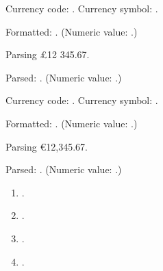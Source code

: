 \documentclass[12pt]{article}
\begin{document}
\DTLGBLocaleHook
Currency code: \DTLCurrencyCode.
Currency symbol: \DTLCurrencySymbol. 

Formatted: \GBformattedresult.
(Numeric value: \DTLdatumvalue{\GBformattedresult}.) 

Parsing £12 345.67.
\DTLparse{}


Parsed: \GBparsed.
(Numeric value: \DTLdatumvalue{\GBparsed}.) 

\DTLIELocaleHook
Currency code: \DTLCurrencyCode.
Currency symbol: \DTLCurrencySymbol. 

Formatted: \IEformattedresult.
(Numeric value: \DTLdatumvalue{\IEformattedresult}.) 

Parsing €12,345.67.
\DTLparse{}


Parsed: \IEparsed.
(Numeric value: \DTLdatumvalue{\IEparsed}.) 

\begin{enumerate}
\item \GBformattedresult.
\item \GBparsed.
\item \IEformattedresult.
\item \IEparsed.
\end{enumerate} 
\end{document}
